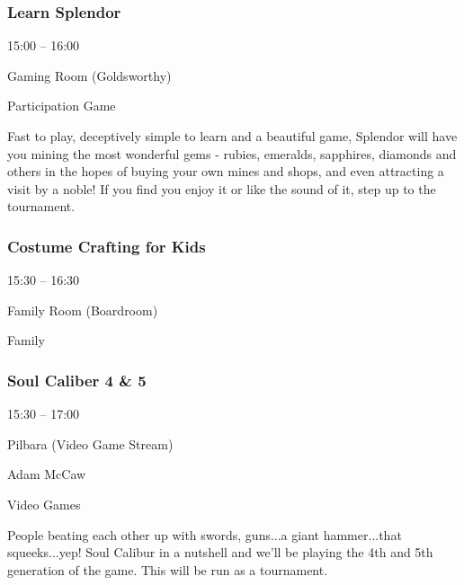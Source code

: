 \documentclass{scrreprt}
\begin{document}
\begin{multicols}{2}
\subsubsection*{Learn Splendor}\begin{description}
\setlength{\itemsep}{0pt}
\setlength{\parsep}{0pt}
\setlength{\parskip}{0pt}
\item[Time:]{15:00 -- 16:00}
\item[Venue:]{Gaming Room (Goldsworthy)}
\item[Tags:]{Participation Game}\end{description}
Fast to play, deceptively simple to learn and a beautiful game, Splendor will have you mining the most wonderful gems - rubies, emeralds, sapphires, diamonds and others in the hopes of buying your own mines and shops, and even attracting a visit by a noble! If you find you enjoy it or like the sound of it, step up to the tournament.
\subsubsection*{Costume Crafting for Kids}\begin{description}
\setlength{\itemsep}{0pt}
\setlength{\parsep}{0pt}
\setlength{\parskip}{0pt}
\item[Time:]{15:30 -- 16:30}
\item[Venue:]{Family Room (Boardroom)}
\item[Tags:]{Family}\end{description}

\subsubsection*{Soul Caliber 4 \& 5}\begin{description}
\setlength{\itemsep}{0pt}
\setlength{\parsep}{0pt}
\setlength{\parskip}{0pt}
\item[Time:]{15:30 -- 17:00}
\item[Venue:]{Pilbara (Video Game Stream)}
\item[People:]{Adam McCaw}
\item[Tags:]{Video Games}\end{description}
People beating each other up with swords, guns...a giant hammer...that squeeks...yep! Soul Calibur in a nutshell and we'll be playing the 4th and 5th generation of the game. This will be run as a tournament.

\end{multicols}
\end{document}
